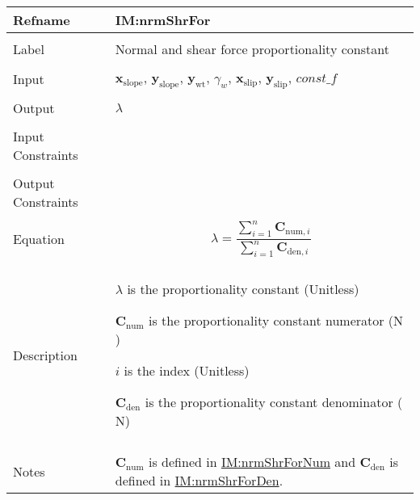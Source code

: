 \documentclass[12pt]{article}
\begin{document}
\vspace{\baselineskip}
\noindent
\begin{minipage}{\textwidth}
\begin{tabular}{>{\raggedright}p{}>{\raggedright\arraybackslash}p{}}
\toprule \textbf{Refname} & \textbf{IM:nrmShrFor}
\label{IM:nrmShrFor}
\\ \midrule \\
Label & Normal and shear force proportionality constant
        
\\ \midrule \\
Input & ${\symbf{x}_{\text{slope}}}$, ${\symbf{y}_{\text{slope}}}$, ${\symbf{y}_{\text{wt}}}$, ${γ_{w}}$, ${\symbf{x}_{\text{slip}}}$, ${\symbf{y}_{\text{slip}}}$, $\mathit{const\_f}$
        
\\ \midrule \\
Output & $λ$
         
\\ \midrule \\
Input Constraints & 
\\ \midrule \\
Output Constraints & 
\\ \midrule \\
Equation & \begin{displaymath}
           λ=\frac{\displaystyle\sum_{i=1}^{n}{{\symbf{C}_{\text{num},i}}}}{\displaystyle\sum_{i=1}^{n}{{\symbf{C}_{\text{den},i}}}}
           \end{displaymath}
\\ \midrule \\
Description & \begin{symbDescription}
              \item{$λ$ is the proportionality constant (Unitless)}
              \item{${\symbf{C}_{\text{num}}}$ is the proportionality constant numerator (${\text{N}}$)}
              \item{$i$ is the index (Unitless)}
              \item{${\symbf{C}_{\text{den}}}$ is the proportionality constant denominator (${\text{N}}$)}
              \end{symbDescription}
\\ \midrule \\
Notes & ${\symbf{C}_{\text{num}}}$ is defined in \hyperref[IM:nrmShrForNum]{IM:nrmShrForNum} and ${\symbf{C}_{\text{den}}}$ is defined in \hyperref[IM:nrmShrForDen]{IM:nrmShrForDen}.
        

\end{tabular}
\end{minipage}
\end{document}
